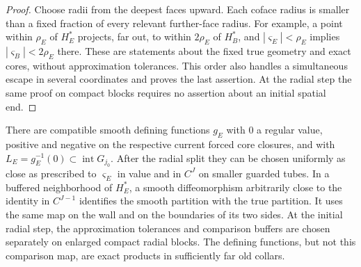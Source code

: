 \begin{proof}
Choose radii from the deepest faces upward.  Each coface radius is
smaller than a fixed fraction of every relevant further-face radius.
For example, a point within $\rho_E$ of $H_E^*$ projects, far out, to
within $2\rho_E$ of $H_B^*$, and $|\varsigma_E|<\rho_E$ implies
$|\varsigma_B|<2\rho_E$ there.  These are statements about the fixed true
geometry and exact cores, without approximation tolerances.  This order
also handles a simultaneous escape in several coordinates and proves the
last assertion.  At the radial step the same proof on compact blocks
requires no assertion about an initial spatial end.
\end{proof}

\begin{lemma}\label{regular:partition}
There are compatible smooth defining functions $g_E$ with $0$ a regular
value, positive and negative on the respective current forced core
closures, and with $L_E=g_E^{-1}(0)\subset\operatorname{int}G_{j_0}$.
After the radial split they can be chosen uniformly as close as
prescribed to $\varsigma_E$ in value and in $C^J$ on smaller guarded
tubes.  In a buffered neighborhood of $H_E^*$, a smooth diffeomorphism
arbitrarily close to the identity in $C^{J-1}$ identifies the smooth
partition with the true partition.  It uses the same map on the wall
and on the boundaries of its two sides.  At the initial radial step,
the approximation tolerances and comparison buffers are chosen separately
on enlarged compact radial blocks.  The defining functions, but not this
comparison map, are exact products in sufficiently far old collars.
\end{lemma}


